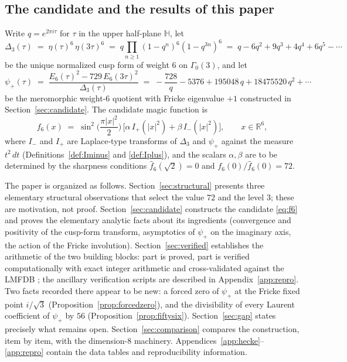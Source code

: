 \documentclass[11pt,reqno]{amsart}
\theoremstyle{plain}
\theoremstyle{definition}
\theoremstyle{remark}
\newcommand{\R}{\mathbb{R}}
\newcommand{\HH}{\mathbb{H}}
\newcommand{\Dthree}{\Delta_{3}}
\newcommand{\psip}{\psi_{+}}
\newcommand{\Ip}{I_{+}}
\newcommand{\Imm}{I_{-}}
\newcommand{\fhat}[1]{\widehat{#1}}
\begin{document}
\subsection{The candidate and the results of this paper}

Write $q=e^{2\pi i\tau}$ for $\tau$ in the upper half-plane $\HH$, let
\[
\Dthree(\tau)\;=\;\eta(\tau)^6\,\eta(3\tau)^6
\;=\;q\prod_{n\ge1}(1-q^n)^6(1-q^{3n})^6
\;=\;q-6q^2+9q^3+4q^4+6q^5-\cdots
\]
be the unique normalized cusp form of weight $6$ on $\Gamma_0(3)$, and
let
\[
\psip(\tau)\;=\;\frac{E_6(\tau)^2-729\,E_6(3\tau)^2}{\Dthree(\tau)}
\;=\;-\frac{728}{q}-5376+195048\,q+18475520\,q^2+\cdots
\]
be the meromorphic weight-$6$ quotient with Fricke eigenvalue $+1$
constructed in Section~\ref{sec:candidate}.  The candidate magic
function is
\begin{equation}\label{eq:f6}
f_6(x)\;=\;\sin^2\!\Big(\frac{\pi|x|^2}{2}\Big)\,
\Big[\alpha\,\Ip(|x|^2)+\beta\,\Imm(|x|^2)\Big],
\qquad x\in\R^6,
\end{equation}
where $\Imm$ and $\Ip$ are Laplace-type transforms of $\Dthree$ and
$\psip$ against the measure $t^2\,dt$
(Definitions~\ref{def:Iminus} and \ref{def:Iplus}), and the scalars
$\alpha,\beta$ are to be determined by the sharpness conditions
$\fhat{f}_6(\sqrt2)=0$ and $f_6(0)/\fhat{f}_6(0)=72$.

The paper is organized as follows.
Section~\ref{sec:structural} presents three elementary structural
observations that select the value $72$ and the level $3$; these are
motivation, not proof.
Section~\ref{sec:candidate} constructs the candidate
\eqref{eq:f6} and proves the elementary analytic facts about its
ingredients (convergence and positivity of the cusp-form transform,
asymptotics of $\psip$ on the imaginary axis, the action of the Fricke
involution).
Section~\ref{sec:verified} establishes the arithmetic of the two
building blocks: part is proved, part is verified computationally with
exact integer arithmetic and cross-validated against the LMFDB
\cite{LMFDB}; the ancillary verification scripts are described in
Appendix~\ref{app:repro}.  Two facts recorded there appear to be new:
a forced zero of $\psip$ at the Fricke fixed point $i/\sqrt3$
(Proposition~\ref{prop:forcedzero}), and the divisibility of every
Laurent coefficient of $\psip$ by $56$
(Proposition~\ref{prop:fiftysix}).
Section~\ref{sec:gap} states precisely what remains open.
Section~\ref{sec:comparison} compares the construction, item by item,
with the dimension-$8$ machinery.
Appendices~\ref{app:hecke}--\ref{app:repro} contain the data tables
and reproducibility information.
\end{document}
